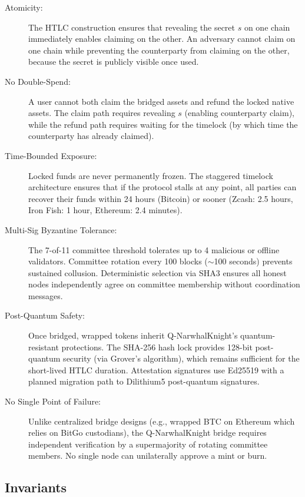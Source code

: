 \documentclass[11pt,a4paper]{article}
\begin{document}
\begin{description}
    \item[Atomicity:] The HTLC construction ensures that revealing the secret $s$ on one chain immediately enables claiming on the other. An adversary cannot claim on one chain while preventing the counterparty from claiming on the other, because the secret is publicly visible once used.

    \item[No Double-Spend:] A user cannot both claim the bridged assets and refund the locked native assets. The claim path requires revealing $s$ (enabling counterparty claim), while the refund path requires waiting for the timelock (by which time the counterparty has already claimed).

    \item[Time-Bounded Exposure:] Locked funds are never permanently frozen. The staggered timelock architecture ensures that if the protocol stalls at any point, all parties can recover their funds within 24 hours (Bitcoin) or sooner (Zcash: 2.5 hours, Iron Fish: 1 hour, Ethereum: 2.4 minutes).

    \item[Multi-Sig Byzantine Tolerance:] The 7-of-11 committee threshold tolerates up to 4 malicious or offline validators. Committee rotation every 100 blocks ($\sim$100 seconds) prevents sustained collusion. Deterministic selection via SHA3 ensures all honest nodes independently agree on committee membership without coordination messages.

    \item[Post-Quantum Safety:] Once bridged, wrapped tokens inherit Q-NarwhalKnight's quantum-resistant protections. The SHA-256 hash lock provides 128-bit post-quantum security (via Grover's algorithm), which remains sufficient for the short-lived HTLC duration. Attestation signatures use Ed25519 with a planned migration path to Dilithium5 post-quantum signatures.

    \item[No Single Point of Failure:] Unlike centralized bridge designs (e.g., wrapped BTC on Ethereum which relies on BitGo custodians), the Q-NarwhalKnight bridge requires independent verification by a supermajority of rotating committee members. No single node can unilaterally approve a mint or burn.
\end{description}

\subsection{Invariants}
\end{document}
